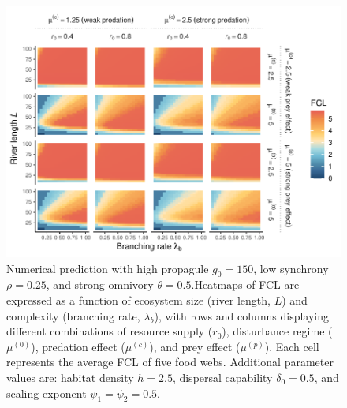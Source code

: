 \begin{figure}
\centering
\includegraphics{../data_fmt/fig_rho025_g150_theta05.pdf}
\caption{Numerical prediction with high propagule \(g_0 = 150\), low
synchrony \(\rho = 0.25\), and strong omnivory \(\theta = 0.5\).Heatmaps
of FCL are expressed as a function of ecosystem size (river length,
\(L\)) and complexity (branching rate, \(\lambda_b\)), with rows and
columns displaying different combinations of resource supply (\(r_0\)),
disturbance regime (\(\mu^{(0)}\)), predation effect (\(\mu^{(c)}\)),
and prey effect (\(\mu^{(p)}\)). Each cell represents the average FCL of
five food webs. Additional parameter values are: habitat density
\(h=2.5\), dispersal capability \(\delta_0=0.5\), and scaling exponent
\(\psi_1=\psi_2=0.5\).\label{fig:fig-num6}}
\end{figure}

\newpage

